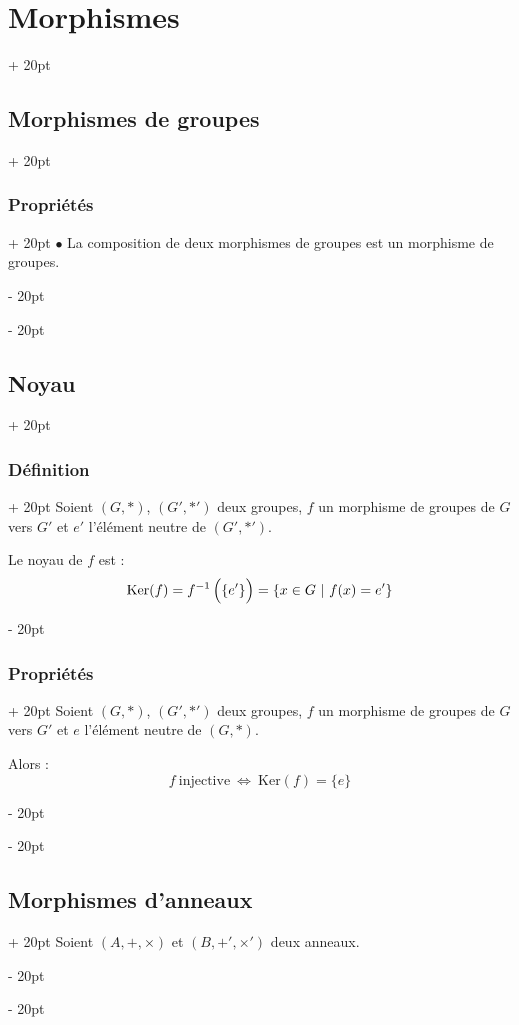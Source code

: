 \documentclass[a4paper, 12pt, twoside]{article}
\newcommand{\ssi}{\ \Leftrightarrow \ }
\newcommand{\lr}[1]{\left( #1 \right)}
\newcommand{\ind}[1][20pt]{\advance\leftskip + #1}
\newcommand{\deind}[1][20pt]{\advance\leftskip - #1}
\newenvironment{indentedenv}[1][20pt]{\par \ind[#1]}{\par \deind}
\newenvironment{indt}[2][20pt]{#2 \begin{indentedenv}[#1]}{\end{indentedenv}} %
\begin{document}
\begin{indt}{\section{Morphismes}}
\begin{indt}{\subsection{Morphismes de groupes}}
\begin{indt}{\subsubsection{Propriétés}}
                $\bullet$ La composition de deux morphismes de groupes est un morphisme de groupes.
            \end{indt}
        \end{indt}
        
        \vspace{6pt}
        
        \begin{indt}{\subsection{Noyau}}
            \begin{indt}{\subsubsection{Définition}}
                Soient $(G, *)$, $(G', *')$ deux groupes, $f$ un morphisme de groupes de $G$ vers $G'$ et $e'$ l'élément neutre de $(G', *')$.
                
                Le noyau de $f$ est :
                    \[ \mathrm{Ker}(f) = f^{-1}\lr{\{e'\} \vphantom{\dfrac a a}} = \{ x \in G\ |\ f(x) = e' \} \]
            \end{indt}
            
            \vspace{6pt}
            
            \begin{indt}{\subsubsection{Propriétés}}
                Soient $(G, *)$, $(G', *')$ deux groupes, $f$ un morphisme de groupes de $G$ vers $G'$ et $e$ l'élément neutre de $(G, *)$.
                
                Alors :
                    \[ f\ \text{injective} \ssi \mathrm{Ker}(f) = \{e\} \]
            \end{indt}
        \end{indt}
        
        \vspace{6pt}
        
        \begin{indt}{\subsection{Morphismes d'anneaux}}
            Soient $(A, +, \times)$ et $(B, +', \times')$ deux anneaux.
            

\end{indt}
\end{indt}
\end{document}
